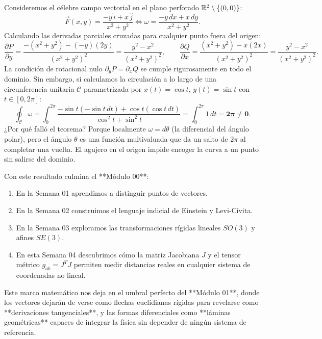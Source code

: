 \documentclass[11pt,letterpaper]{article}
\begin{document}
Consideremos el célebre campo vectorial en el plano perforado $\mathbb{R}^2 \setminus \{(0,0)\}$:
\[
\vec{F}(x, y) = \frac{-y\,\hat{i} + x\,\hat{j}}{x^2 + y^2} \iff \omega = \frac{-y\,dx + x\,dy}{x^2 + y^2}.
\]
Calculando las derivadas parciales cruzadas para cualquier punto fuera del origen:
\[
\frac{\partial P}{\partial y} = \frac{-(x^2 + y^2) - (-y)(2y)}{(x^2 + y^2)^2} = \frac{y^2 - x^2}{(x^2 + y^2)^2}, \qquad
\frac{\partial Q}{\partial x} = \frac{(x^2 + y^2) - x(2x)}{(x^2 + y^2)^2} = \frac{y^2 - x^2}{(x^2 + y^2)^2}.
\]
La condición de rotacional nulo $\partial_y P = \partial_x Q$ se cumple rigurosamente en todo el dominio. Sin embargo, si calculamos la circulación a lo largo de una circunferencia unitaria $\mathcal{C}$ parametrizada por $x(t) = \cos t$, $y(t) = \sin t$ con $t \in [0, 2\pi]$:
\[
\oint_\mathcal{C} \omega = \int_0^{2\pi} \frac{-\sin t(-\sin t\,dt) + \cos t(\cos t\,dt)}{\cos^2 t + \sin^2 t} = \int_0^{2\pi} 1\,dt = \mathbf{2\pi \neq 0}.
\]
¿Por qué falló el teorema? Porque localmente $\omega = d\theta$ (la diferencial del ángulo polar), pero el ángulo $\theta$ es una función multivaluada que da un salto de $2\pi$ al completar una vuelta. El agujero en el origen impide encoger la curva a un punto sin salirse del dominio.

Con este resultado culmina el **Módulo 00**:
\begin{enumerate}
    \item En la Semana 01 aprendimos a distinguir puntos de vectores.
    \item En la Semana 02 construimos el lenguaje indicial de Einstein y Levi-Civita.
    \item En la Semana 03 exploramos las transformaciones rígidas lineales $SO(3)$ y afines $SE(3)$.
    \item En esta Semana 04 descubrimos cómo la matriz Jacobiana $J$ y el tensor métrico $g_{ab} = J^T J$ permiten medir distancias reales en cualquier sistema de coordenadas no lineal.
\end{enumerate}
Este marco matemático nos deja en el umbral perfecto del **Módulo 01**, donde los vectores dejarán de verse como flechas euclidianas rígidas para revelarse como **derivaciones tangenciales**, y las formas diferenciales como **láminas geométricas** capaces de integrar la física sin depender de ningún sistema de referencia.
\end{document}
